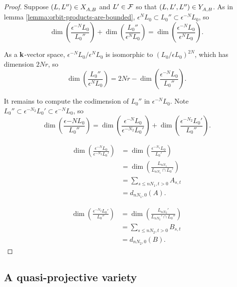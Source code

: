 \documentclass[a4paper, 11pt]{report}
\begin{document}
\begin{proof}
Suppose $(L,L'')\in X_{A,B}^{}$ and $L'\in\mathcal{F}$ so that $(L,L',L'')\in Y_{A,B}^{}$. As in lemma \ref{lemma:orbit-products-are-bounded}, $\epsilon^N L_0\subset L_0''\subset \epsilon^{-N}L_0$, so
\begin{equation*}
\dim\left(\frac{\epsilon^{-N}L_0}{L_0''}\right) + \dim\left(\frac{L_0''}{\epsilon^N L_0}\right) = \dim\left(\frac{\epsilon^{-N}L_0}{\epsilon^N L_0}\right).
\end{equation*}

As a $\mathbf{k}$-vector space, $\epsilon^{-N}L_0/\epsilon^N L_0$ is isomorphic to $(L_0/{\epsilon L_0})^{2N}$, which has dimension $2Nr$, so
\begin{equation*}
\dim\left(\frac{L_0''}{\epsilon^N L_0}\right) = 2Nr - \dim\left(\frac{\epsilon^{-N}L_0}{L_0''}\right).
\end{equation*}

It remains to compute the codimension of $L_0''$ in $\epsilon^{-N}L_0$. Note $L_0''\subset \epsilon^{-N_2}L_0'\subset \epsilon^{-N} L_0$, so
\begin{equation*}
\dim\left(\frac{\epsilon{-N}L_0}{L_0''}\right) = \dim\left(\frac{\epsilon^{-N}L_0}{\epsilon^{-N_2}L_0'}\right) + \dim\left(\frac{\epsilon^{-N_2}L_0'}{L_0''}\right).
\end{equation*}

\begin{align*}
\dim\left(\frac{\epsilon^{-N}L_0}{\epsilon^{-N_2}L_0'}\right)
&= \dim\left(\frac{\epsilon^{-N_1}L_0}{L_0'}\right)\\
&= \dim\left(\frac{L_{nN_1}}{L_{nN_1}\cap L_0'}\right)\\
&= \sum_{s\le nN_1, t>0} A_{s,t}\\
&= d_{nN_1,0}(A).
\end{align*}

\begin{align*}
\dim\left(\frac{\epsilon^{-N_2}L_0'}{L_0''}\right)
&= \dim\left(\frac{ L_{nN_2}'}{L_{nN_2}'\cap L_0''}\right)\\
&= \sum_{s\le nN_2, t>0} B_{s,t}\\
&= d_{nN_2,0}(B).
\end{align*}
\end{proof}

\subsection{A quasi-projective variety}
\end{document}
